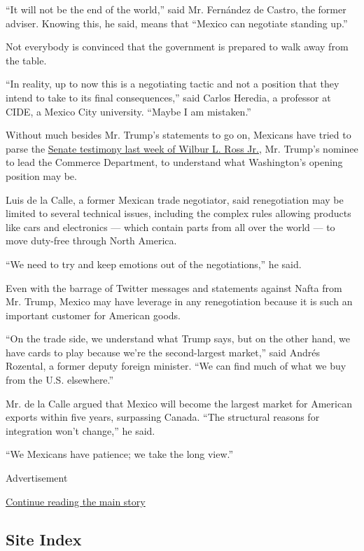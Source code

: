 ``It will not be the end of the world,'' said Mr. Fernández de Castro,
the former adviser. Knowing this, he said, means that ``Mexico can
negotiate standing up.''

Not everybody is convinced that the government is prepared to walk away
from the table.

``In reality, up to now this is a negotiating tactic and not a position
that they intend to take to its final consequences,'' said Carlos
Heredia, a professor at CIDE, a Mexico City university. ``Maybe I am
mistaken.''

Without much besides Mr. Trump's statements to go on, Mexicans have
tried to parse the
\href{https://www.nytimes3xbfgragh.onion/2017/01/18/us/politics/wilbur-ross-commerce-secretary-trump-trade-nafta.html}{Senate
testimony last week of Wilbur L. Ross Jr.}, Mr. Trump's nominee to lead
the Commerce Department, to understand what Washington's opening
position may be.

Luis de la Calle, a former Mexican trade negotiator, said renegotiation
may be limited to several technical issues, including the complex rules
allowing products like cars and electronics --- which contain parts from
all over the world --- to move duty-free through North America.

``We need to try and keep emotions out of the negotiations,'' he said.

Even with the barrage of Twitter messages and statements against Nafta
from Mr. Trump, Mexico may have leverage in any renegotiation because it
is such an important customer for American goods.

``On the trade side, we understand what Trump says, but on the other
hand, we have cards to play because we're the second-largest market,''
said Andrés Rozental, a former deputy foreign minister. ``We can find
much of what we buy from the U.S. elsewhere.''

Mr. de la Calle argued that Mexico will become the largest market for
American exports within five years, surpassing Canada. ``The structural
reasons for integration won't change,'' he said.

``We Mexicans have patience; we take the long view.''

Advertisement

\protect\hyperlink{after-bottom}{Continue reading the main story}

\hypertarget{site-index}{%
\subsection{Site Index}\label{site-index}}

